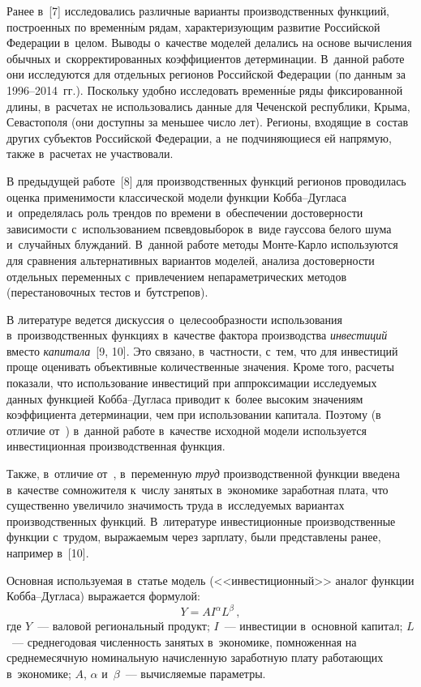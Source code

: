 \begin{multicols}{2}
  Ранее в~[7] исследовались различные варианты производственных функциий, 
построенных по временн$\acute{\mbox{ы}}$м рядам, характеризующим развитие Российской Федерации 
в~целом. Выводы о~качестве моделей делались на основе вычисления обычных 
и~скорректированных коэффициентов детерминации. В~данной работе они исследуются 
для отдельных регионов Российской Федерации (по данным за 1996--2014~гг.). 
Поскольку удобно исследовать временн$\acute{\mbox{ы}}$е ряды фиксированной длины, в~расчетах не 
использовались данные для Чеченской республики, Крыма, Севастополя (они доступны 
за меньшее число лет). Регионы, входящие в~состав других субъектов Российской 
Федерации, а~не подчиняющиеся ей напрямую, также в~расчетах не участвовали.
  
  В предыдущей работе~[8] для производственных функций регионов проводилась 
оценка применимости классической модели функции Коб\-ба--Дуг\-ла\-са и~определялась 
роль трендов по времени в~обеспечении достоверности зависимости с~использованием 
псвевдовыборок в~виде гауссова белого шума и~случайных блужданий. В~данной 
работе методы Монте-Карло используются для сравнения альтернативных вариантов 
моделей, анализа достоверности отдельных переменных с~привлечением 
непараметрических методов (перестановочных тес\-тов и~бутстрепов).
  
  В литературе ведется дискуссия о~целесообразности использования 
в~производственных функциях в~качестве фактора производства \textit{инвестиций} 
вместо \textit{капитала}~[9, 10]. Это связано, в~част\-ности, с~тем, что для инвестиций 
проще оценивать объективные количественные значения. Кроме того, расчеты показали, 
что использование ин\-вес\-ти\-ций при аппроксимации исследуемых данных функцией 
Коб\-ба--Дуг\-ла\-са приводит к~более высоким значениям коэффициента детерминации, чем 
при использовании капитала. Поэтому (в отличие
 от~\cite{7-ki, 8-ki}) в~данной работе в~качестве исходной модели используется 
инвестиционная производственная функция. 
  
  Также, в~отличие от~\cite{7-ki, 8-ki}, в~переменную \textit{труд} производственной функции 
введена в~качестве сомножителя к~числу занятых в~экономике заработная плата, что 
существенно увеличило значимость труда в~исследуемых вариантах производственных 
функций. В~литературе инвестиционные производственные функции с~трудом, 
выражаемым через зарплату, были представлены ранее, например в~[10].
  
  Основная используемая в~статье модель (<<инвестиционный>> аналог функции 
Коб\-ба--Дуг\-ла\-са) выражается формулой:
  \begin{equation}
  Y=A I^\alpha L^\beta\,,
  \end{equation}
  где $Y$~--- валовой региональный продукт;
  $I$~--- инвестиции в~основной капитал;
  $L$~--- среднегодовая численность занятых в~экономике, помноженная на 
среднемесячную номинальную начисленную заработную плату работающих 
в~экономике; 
  $A$, $\alpha$ и~$\beta$~--- вычисляемые параметры.
  

\end{multicols}
